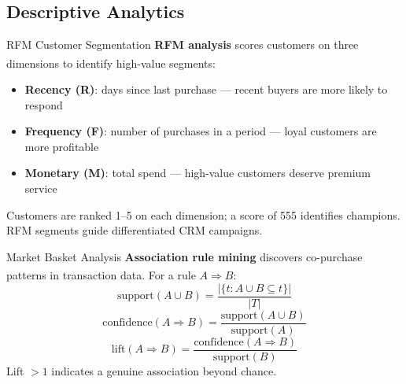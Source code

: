 \subsection{Descriptive Analytics}


\begin{v3topic}{RFM Customer Segmentation}
    \textbf{RFM analysis} scores customers on three dimensions to identify high-value segments\textsuperscript{\cite[][pp.~110--115]{chaffeyDigitalBusinessECommerce2019}}:
    \begin{itemize}
        \item \textbf{Recency (R)}: days since last purchase --- recent buyers are more likely to respond
        \item \textbf{Frequency (F)}: number of purchases in a period --- loyal customers are more profitable
        \item \textbf{Monetary (M)}: total spend --- high-value customers deserve premium service
    \end{itemize}
    Customers are ranked 1--5 on each dimension; a score of 555 identifies champions. RFM segments guide differentiated CRM campaigns.

\end{v3topic}
\begin{v3topic}{Market Basket Analysis}
    \textbf{Association rule mining} discovers co-purchase patterns in transaction data\textsuperscript{\cite[][pp.~217--221]{leskovecMiningMassiveDatasets2014}}.
    For a rule $A \Rightarrow B$:
    \begin{equation}
        \text{support}(A \cup B) = \frac{|\{t : A \cup B \subseteq t\}|}{|T|}
    \end{equation}
    \begin{equation}
        \text{confidence}(A \Rightarrow B) = \frac{\text{support}(A \cup B)}{\text{support}(A)}
    \end{equation}
    \begin{equation}
        \text{lift}(A \Rightarrow B) = \frac{\text{confidence}(A \Rightarrow B)}{\text{support}(B)}
    \end{equation}
    Lift $> 1$ indicates a genuine association beyond chance.

\end{v3topic}
